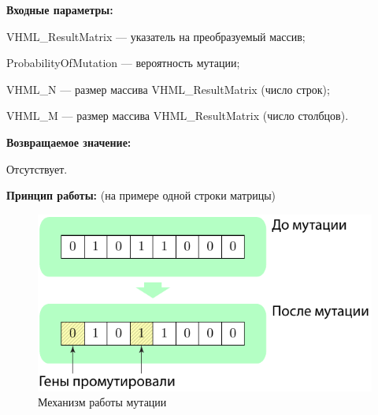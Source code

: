 \textbf{Входные параметры:}
 
VHML\_ResultMatrix --- указатель на преобразуемый массив;
 
ProbabilityOfMutation --- вероятность мутации;
 
VHML\_N --- размер массива VHML\_ResultMatrix (число строк);
 
VHML\_M --- размер массива VHML\_ResultMatrix (число столбцов).

\textbf{Возвращаемое значение:} 

Отсутствует.

\textbf{Принцип работы:}
(на примере одной строки матрицы)

\begin{figure} [h]
  \center
  \includegraphics [scale=0.8] {HML_MutationBinaryMatrix_Sheme}
  \caption{Механизм работы мутации} 
  \label{img:HML_MutationBinaryMatrix_Sheme}  
\end{figure}
